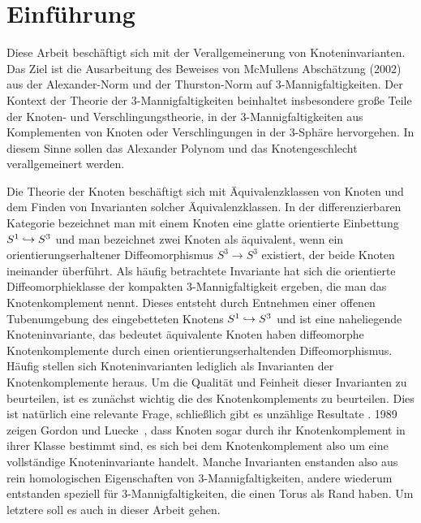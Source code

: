 \section{Einführung}
		
	\begin{minipage}[t][\textheight][t]{0.76\textwidth}

	Diese Arbeit beschäftigt sich mit der Verallgemeinerung von Knoteninvarianten. Das Ziel ist die Ausarbeitung des Beweises von McMullens Abschätzung (2002) aus \cite{MCMULLEN.2002} der Alexander-Norm und der Thurston-Norm auf 3-Mannigfaltigkeiten. Der Kontext der Theorie der 3-Mannigfaltigkeiten beinhaltet insbesondere große Teile der Knoten- und Verschlingungstheorie, in der 3-Mannigfaltigkeiten aus Komplementen von Knoten oder Verschlingungen in der 3-Sphäre hervorgehen. In diesem Sinne sollen das Alexander Polynom und das Knotengeschlecht verallgemeinert werden.

	Die Theorie der Knoten beschäftigt sich mit Äquivalenzklassen von Knoten und dem Finden von Invarianten solcher Äquivalenzklassen. In der differenzierbaren Kategorie bezeichnet man mit einem Knoten eine glatte orientierte Einbettung $S^1\hookrightarrow S^3$ und man bezeichnet zwei Knoten als äquivalent, wenn ein orientierungserhaltener Diffeomorphismus $S^3\to S^3$ existiert, der beide Knoten ineinander überführt. Als häufig betrachtete Invariante hat sich die orientierte Diffeomorphieklasse der kompakten 3-Mannigfaltigkeit ergeben, die man das Knotenkomplement nennt. Dieses entsteht durch Entnehmen einer offenen Tubenumgebung des eingebetteten Knotens $S^1 \hookrightarrow S^3$ und ist eine naheliegende Knoteninvariante, das bedeutet äquivalente Knoten haben diffeomorphe Knotenkomplemente durch einen orientierungserhaltenden Diffeomorphismus. Häufig stellen sich Knoteninvarianten lediglich als Invarianten der Knotenkomplemente heraus. Um die Qualität und Feinheit dieser Invarianten zu beurteilen, ist es zunächst wichtig die des Knotenkomplements zu beurteilen. Dies ist natürlich eine relevante Frage, schließlich gibt es unzählige Resultate . 1989 zeigen Gordon und Luecke~\cite{Gordon.1989}, dass Knoten sogar durch ihr Knotenkomplement in ihrer Klasse bestimmt sind, es sich bei dem Knotenkomplement also um eine vollständige Knoteninvariante handelt. Manche Invarianten enstanden also aus rein homologischen Eigenschaften von 3-Mannigfaltigkeiten, andere wiederum entstanden speziell für 3-Mannigfaltigkeiten, die einen Torus als Rand haben. Um letztere soll es auch in dieser Arbeit gehen.


\end{minipage}
